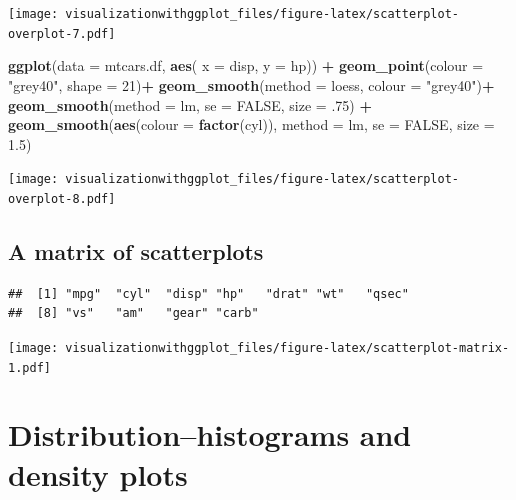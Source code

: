 \documentclass[]{krantz}
\makeatletter
\newenvironment{Shaded}{\begin{snugshade}}{\end{snugshade}}
\newcommand{\DataTypeTok}[1]{\textcolor[rgb]{0.13,0.29,0.53}{#1}}
\newcommand{\DecValTok}[1]{\textcolor[rgb]{0.00,0.00,0.81}{#1}}
\newcommand{\FloatTok}[1]{\textcolor[rgb]{0.00,0.00,0.81}{#1}}
\newcommand{\KeywordTok}[1]{\textcolor[rgb]{0.13,0.29,0.53}{\textbf{#1}}}
\newcommand{\NormalTok}[1]{#1}
\newcommand{\OperatorTok}[1]{\textcolor[rgb]{0.81,0.36,0.00}{\textbf{#1}}}
\newcommand{\OtherTok}[1]{\textcolor[rgb]{0.56,0.35,0.01}{#1}}
\newcommand{\StringTok}[1]{\textcolor[rgb]{0.31,0.60,0.02}{#1}}
\newenvironment{kframe}{%
\medskip{}
\setlength{\fboxsep}{.8em}
 \def\at@end@of@kframe{}%
 \ifinner\ifhmode%
  \def\at@end@of@kframe{\end{minipage}}%
  \begin{minipage}{\columnwidth}%
 \fi\fi%
 \def\FrameCommand##1{\hskip\@totalleftmargin \hskip-\fboxsep
 \colorbox{shadecolor}{##1}\hskip-\fboxsep
     \hskip-\linewidth \hskip-\@totalleftmargin \hskip\columnwidth}%
 \MakeFramed {\advance\hsize-\width
   \@totalleftmargin\z@ \linewidth\hsize
   \@setminipage}}%
 {\par\unskip\endMakeFramed%
 \at@end@of@kframe}
\renewenvironment{Shaded}{\begin{kframe}}{\end{kframe}}
\makeatother
\begin{document}
\texttt{[image: visualizationwithggplot\_files/figure-latex/scatterplot-overplot-7.pdf]}

\begin{Shaded}
\begin{Highlighting}[]
\KeywordTok{ggplot}\NormalTok{(}\DataTypeTok{data =}\NormalTok{ mtcars.df, }\KeywordTok{aes}\NormalTok{( }\DataTypeTok{x =}\NormalTok{ disp, }\DataTypeTok{y =}\NormalTok{ hp)) }\OperatorTok{+}
\StringTok{  }\KeywordTok{geom_point}\NormalTok{(}\DataTypeTok{colour =} \StringTok{"grey40"}\NormalTok{, }\DataTypeTok{shape =} \DecValTok{21}\NormalTok{)}\OperatorTok{+}
\StringTok{  }\KeywordTok{geom_smooth}\NormalTok{(}\DataTypeTok{method =}\NormalTok{ loess, }\DataTypeTok{colour =} \StringTok{"grey40"}\NormalTok{)}\OperatorTok{+}
\StringTok{  }\KeywordTok{geom_smooth}\NormalTok{(}\DataTypeTok{method =}\NormalTok{ lm, }\DataTypeTok{se =} \OtherTok{FALSE}\NormalTok{, }\DataTypeTok{size =} \FloatTok{.75}\NormalTok{) }\OperatorTok{+}
\StringTok{    }\KeywordTok{geom_smooth}\NormalTok{(}\KeywordTok{aes}\NormalTok{(}\DataTypeTok{colour =} \KeywordTok{factor}\NormalTok{(cyl)), }
        \DataTypeTok{method =}\NormalTok{ lm, }\DataTypeTok{se =} \OtherTok{FALSE}\NormalTok{, }\DataTypeTok{size =} \FloatTok{1.5}\NormalTok{)}
\end{Highlighting}
\end{Shaded}

\texttt{[image: visualizationwithggplot\_files/figure-latex/scatterplot-overplot-8.pdf]}

\hypertarget{a-matrix-of-scatterplots}{%
\section{A matrix of scatterplots}\label{a-matrix-of-scatterplots}}

\begin{verbatim}
##  [1] "mpg"  "cyl"  "disp" "hp"   "drat" "wt"   "qsec"
##  [8] "vs"   "am"   "gear" "carb"
\end{verbatim}

\texttt{[image: visualizationwithggplot\_files/figure-latex/scatterplot-matrix-1.pdf]}

\cleardoublepage

\hypertarget{Distribution}{%
\chapter{Distribution--histograms and density plots}\label{Distribution}}
\end{document}
